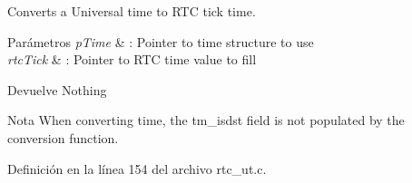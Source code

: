Converts a Universal time to R\+TC tick time. 


\begin{DoxyParams}{Parámetros}
{\em p\+Time} & \+: Pointer to time structure to use \\
\hline
{\em rtc\+Tick} & \+: Pointer to R\+TC time value to fill \\
\hline
\end{DoxyParams}
\begin{DoxyReturn}{Devuelve}
Nothing 
\end{DoxyReturn}
\begin{DoxyNote}{Nota}
When converting time, the \textquotesingle{}tm\+\_\+isdst\textquotesingle{} field is not populated by the conversion function. 
\end{DoxyNote}


Definición en la línea 154 del archivo rtc\+\_\+ut.\+c.

